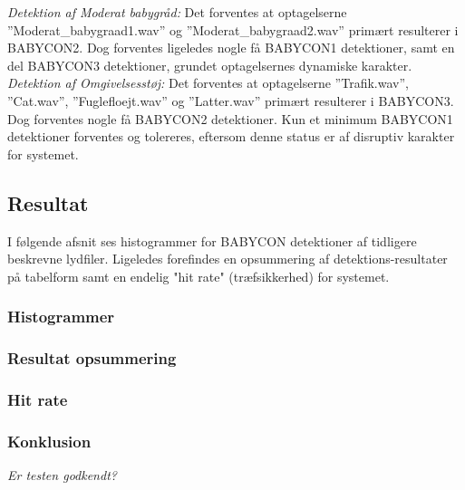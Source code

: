 \textit{Detektion af Moderat babygråd:} Det forventes at optagelserne ''Moderat\_babygraad1.wav'' og ''Moderat\_babygraad2.wav'' primært resulterer i BABYCON2. Dog forventes ligeledes nogle få BABYCON1 detektioner, samt en del BABYCON3 detektioner, grundet optagelsernes dynamiske karakter. \\

\textit{Detektion af Omgivelsesstøj:} Det forventes at optagelserne ''Trafik.wav'', ''Cat.wav'', ''Fuglefloejt.wav'' og ''Latter.wav'' primært resulterer i BABYCON3. Dog forventes nogle få BABYCON2 detektioner. Kun et minimum BABYCON1 detektioner forventes og tolereres, eftersom denne status er af disruptiv karakter for systemet.\\

\subsection{Resultat} 
I følgende afsnit ses histogrammer for BABYCON detektioner af tidligere beskrevne lydfiler. Ligeledes forefindes en opsummering af detektions-resultater på tabelform samt en endelig "hit rate" (træfsikkerhed) for systemet.

\subsubsection{Histogrammer}

\subsubsection{Resultat opsummering}

\subsubsection{Hit rate}

\subsubsection{Konklusion}

\textit{Er testen godkendt?}

